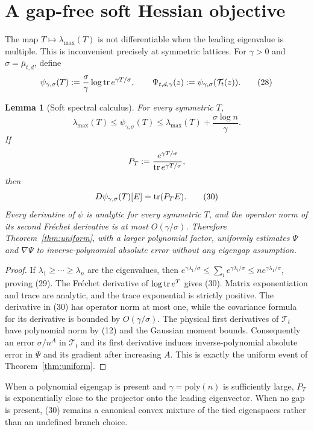 \documentclass[10pt]{article}
\newtheorem{lemma}[theorem]{Lemma}
\theoremstyle{definition}
\newcommand{\tr}{\mathop{\rm tr}}
\newcommand{\poly}{\mathrm{poly}}
\newcommand{\cT}{\mathcal{T}}
\begin{document}
\section{A gap-free soft Hessian objective}                        \label{sec:soft}

The map $T\mapsto\lambda_{\max}(T)$ is not differentiable when the leading
eigenvalue is multiple.  This is inconvenient precisely at symmetric
lattices.  For $\gamma>0$ and $\sigma=\overline\mu_{t,d}$, define
\[
 \psi_{\gamma,\sigma}(T)
 :=\frac{\sigma}{\gamma}\log\tr e^{\gamma T/\sigma},
 \qquad
 \Psi_{t,d,\gamma}(z):=\psi_{\gamma,\sigma}(\cT_t(z)).             \tag{28}
\]

\begin{lemma}[Soft spectral calculus]                              \label{lem:soft}
For every symmetric $T$,
\[
 \lambda_{\max}(T)
 \le\psi_{\gamma,\sigma}(T)
 \le\lambda_{\max}(T)+\frac{\sigma\log n}{\gamma}.              \tag{29}
\]
If
\[
 P_T:=\frac{e^{\gamma T/\sigma}}{\tr e^{\gamma T/\sigma}},
\]
then
\[
 D\psi_{\gamma,\sigma}(T)[E]=\tr(P_TE).                           \tag{30}
\]
Every derivative of $\psi$ is analytic for every symmetric $T$, and the
operator norm of its second Fr\'echet derivative is at most
$O(\gamma/\sigma)$.  Therefore Theorem~\ref{thm:uniform}, with a larger
polynomial factor, uniformly estimates $\Psi$ and $\nabla\Psi$ to
inverse-polynomial absolute error without any eigengap assumption.
\end{lemma}

\begin{proof}
If $\lambda_1\ge\cdots\ge\lambda_n$ are the eigenvalues, then
$e^{\gamma\lambda_1/\sigma}\le\sum_i e^{\gamma\lambda_i/\sigma}
\le ne^{\gamma\lambda_1/\sigma}$, proving (29).  The Fr\'echet derivative of
$\log\tr e^T$ gives (30).  Matrix exponentiation and trace are analytic, and
the trace exponential is strictly positive.  The derivative in (30) has
operator norm at most one, while the covariance formula for its derivative
is bounded by $O(\gamma/\sigma)$.  The physical first derivatives of
$\cT_t$ have polynomial norm by (12) and the Gaussian moment bounds.
Consequently an error $\sigma/n^A$ in $\cT_t$ and its first derivative
induces inverse-polynomial absolute error in $\Psi$ and its gradient after
increasing $A$.  This is exactly the uniform event of
Theorem~\ref{thm:uniform}.
\end{proof}

When a polynomial eigengap is present and $\gamma=\poly(n)$ is sufficiently
large, $P_T$ is exponentially close to the projector onto the leading
eigenvector.  When no gap is present, (30) remains a canonical convex mixture
of the tied eigenspaces rather than an undefined branch choice.
\end{document}
